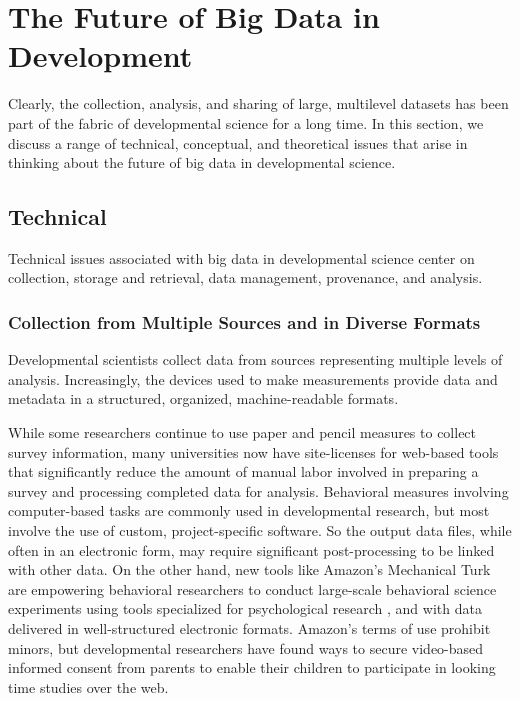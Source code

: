 \documentclass[letterpaper,man,apacite]{apa6}
\begin{document}
\section{The Future of Big Data in Development}

Clearly, the collection, analysis, and sharing of large, multilevel datasets has been part of the fabric of developmental science for a long time.
In this section, we discuss a range of technical, conceptual, and theoretical issues that arise in thinking about the future of big data in developmental science. 

\subsection{Technical}

Technical issues associated with big data in developmental science center on collection, storage and retrieval, data management, provenance, and analysis. 

\subsubsection{Collection from Multiple Sources and in Diverse Formats}

Developmental scientists collect data from sources representing multiple levels of analysis.
Increasingly, the devices used to make measurements provide data and metadata in a structured, organized, machine-readable formats.

While some researchers continue to use paper and pencil measures to collect survey information, many universities now have site-licenses for web-based tools \cite{SurveyMonkey, Qualtrics} that significantly reduce the amount of manual labor involved in preparing a survey and processing completed data for analysis. 
Behavioral measures involving computer-based tasks are commonly used in developmental research, but most involve the use of custom, project-specific software.
So the output data files, while often in an electronic form, may require significant post-processing to be linked with other data.
On the other hand, new tools like Amazon's Mechanical Turk \cite{MTurk} are empowering behavioral researchers to conduct large-scale behavioral science experiments using tools specialized for psychological research \cite{PsiTurk}, and with data delivered in well-structured electronic formats.
Amazon's terms of use prohibit minors, but developmental researchers have found ways to secure video-based informed consent from parents to enable their children to participate in looking time studies \cite{Lookit} over the web.
\end{document}
